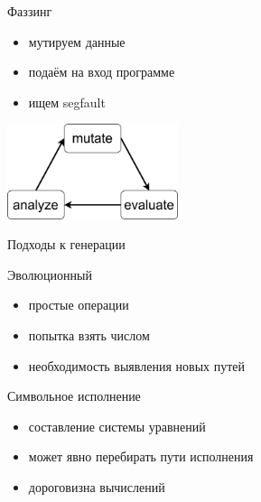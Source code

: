 \documentclass[hyperref={unicode=true}, 12pt]{beamer}
\begin{document}

	\begin{frame}{Фаззинг}
		\begin{minipage}{0.6\textwidth}
			
			\begin{itemize}
				\item мутируем данные
				
				\item подаём на вход программе
				
				\item ищем segfault
			\end{itemize}
			
		\end{minipage}\begin{minipage}{0.43\textwidth}
		
		\includegraphics[width=5cm]{fuzz_loop.png}
	\end{minipage}
	\end{frame}

	\begin{frame}[t]{Подходы к генерации}
		
		\vspace{1.2cm}
		\begin{minipage}[t]{0.5\textwidth}
			\raggedright
			Эволюционный
			
			\begin{itemize}
				\item простые операции
				\item попытка взять числом
				\item необходимость выявления новых путей
			\end{itemize}
			
		\end{minipage}\begin{minipage}[t]{0.5\textwidth}
			\raggedright
			Символьное исполнение
			
			\begin{itemize}
				\item составление системы уравнений
				\item может явно перебирать пути исполнения
				\item дороговизна вычислений
			\end{itemize}
		
	\end{minipage}
			
	\end{frame}
\end{document}
